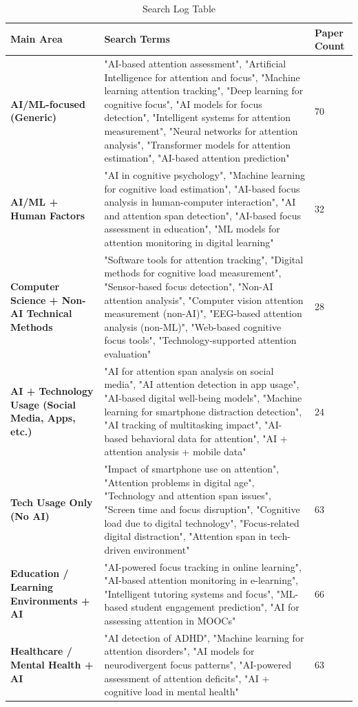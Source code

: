 \documentclass[12pt]{article}
\begin{document}
\begin{table}[H]
\caption{Search Log Table}
\begin{tabular}{|p{}|p{}|p{}|}
\hline
\textbf{Main Area} & \textbf{Search Terms} & \textbf{Paper Count} \\
\hline
\textbf{AI/ML-focused (Generic)} & "AI-based attention assessment", "Artificial Intelligence for attention and focus", "Machine learning attention tracking", "Deep learning for cognitive focus", "AI models for focus detection", "Intelligent systems for attention measurement", "Neural networks for attention analysis", "Transformer models for attention estimation", "AI-based attention prediction" & 70 \\
\hline
\textbf{AI/ML + Human Factors} & "AI in cognitive psychology", "Machine learning for cognitive load estimation", "AI-based focus analysis in human-computer interaction", "AI and attention span detection", "AI-based focus assessment in education", "ML models for attention monitoring in digital learning" & 32 \\
\hline
\textbf{Computer Science + Non-AI Technical Methods} & "Software tools for attention tracking", "Digital methods for cognitive load measurement", "Sensor-based focus detection", "Non-AI attention analysis", "Computer vision attention measurement (non-AI)", "EEG-based attention analysis (non-ML)", "Web-based cognitive focus tools", "Technology-supported attention evaluation" & 28 \\
\hline
\textbf{AI + Technology Usage (Social Media, Apps, etc.)} & "AI for attention span analysis on social media", "AI attention detection in app usage", "AI-based digital well-being models", "Machine learning for smartphone distraction detection", "AI tracking of multitasking impact", "AI-based behavioral data for attention", "AI + attention analysis + mobile data" & 24 \\
\hline
\textbf{Tech Usage Only (No AI)} & "Impact of smartphone use on attention", "Attention problems in digital age", "Technology and attention span issues", "Screen time and focus disruption", "Cognitive load due to digital technology", "Focus-related digital distraction", "Attention span in tech-driven environment" & 63 \\
\hline
\textbf{Education / Learning Environments + AI} & "AI-powered focus tracking in online learning", "AI-based attention monitoring in e-learning", "Intelligent tutoring systems and focus", "ML-based student engagement prediction", "AI for assessing attention in MOOCs" & 66 \\
\hline
\textbf{Healthcare / Mental Health + AI} & "AI detection of ADHD", "Machine learning for attention disorders", "AI models for neurodivergent focus patterns", "AI-powered assessment of attention deficits", "AI + cognitive load in mental health" & 63 \\
\hline
\end{tabular}
\end{table}
\end{document}
